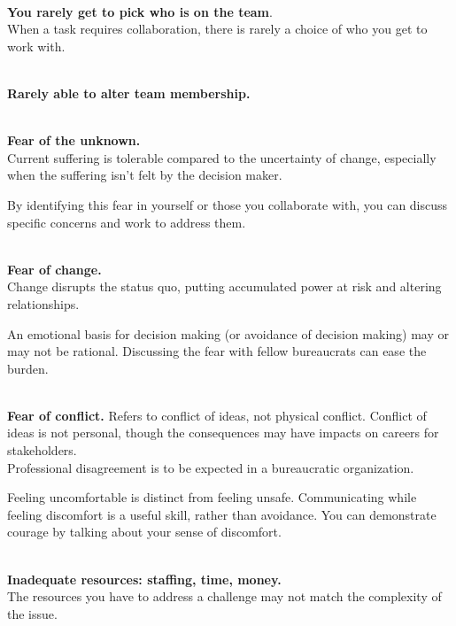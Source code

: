 \ \\

\textbf{You rarely get to pick who is on the team}. \\
When a task requires collaboration, there is rarely a choice of who you get to work with. 

\ \\

\textbf{Rarely able to alter team membership.}

\ \\

\textbf{Fear of the unknown.}\\
Current suffering is tolerable compared to the uncertainty of change, especially when the suffering isn't felt by the decision maker.

By identifying this fear in yourself or those you collaborate with, you can discuss specific concerns and work to address them.

\ \\

\textbf{Fear of change.} \\
Change disrupts the status quo, putting accumulated power at risk and altering relationships. 

An emotional basis for decision making (or avoidance of decision making) may or may not be rational. Discussing the fear with fellow bureaucrats can ease the burden. 

\ \\

\textbf{Fear of conflict.} Refers to conflict of ideas, not physical conflict. Conflict of ideas is not personal, though the consequences may have impacts on careers for stakeholders. \\
Professional disagreement is to be expected in a bureaucratic organization.

Feeling uncomfortable is distinct from feeling unsafe. Communicating while feeling discomfort is a useful skill, rather than avoidance. You can demonstrate courage by talking about your sense of discomfort. 

\ \\

\textbf{Inadequate resources: staffing, time, money.}\\
The resources you have to address a challenge may not match the complexity of the issue.

\ \\

